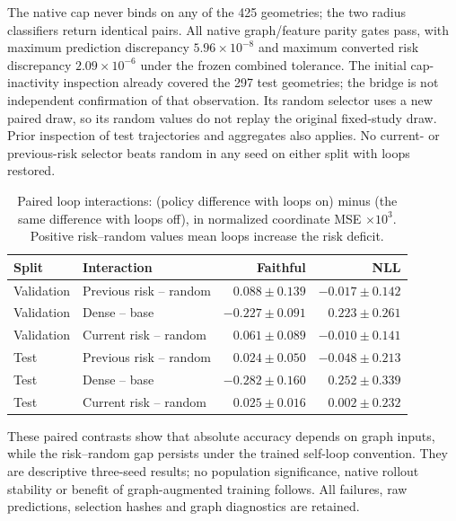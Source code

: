 The native cap never binds on any of the 425 geometries; the two radius
classifiers return identical pairs. All native graph/feature parity gates pass,
with maximum prediction discrepancy $5.96\times10^{-8}$ and maximum converted
risk discrepancy $2.09\times10^{-6}$ under the frozen combined tolerance.
The initial cap-inactivity inspection already covered the 297 test geometries;
the bridge is not independent confirmation of that observation. Its random
selector uses a new paired draw, so its random values do not replay the
original fixed-study draw. Prior inspection of test trajectories and aggregates
also applies. No current- or previous-risk selector beats random in any seed
on either split with loops restored.

\begin{table}[ht]
\centering\small
\caption{Paired loop interactions: (policy difference with loops on) minus
(the same difference with loops off), in normalized coordinate MSE $\times10^3$.
Positive risk--random values mean loops increase the risk deficit.}
\label{tab:graph-loop-interactions}
\begin{tabular}{llrr}
\toprule
Split & Interaction & Faithful & NLL\\
\midrule
Validation & Previous risk -- random & $0.088\pm0.139$ & $-0.017\pm0.142$\\
Validation & Dense -- base & $-0.227\pm0.091$ & $0.223\pm0.261$\\
Validation & Current risk -- random & $0.061\pm0.089$ & $-0.010\pm0.141$\\
Test & Previous risk -- random & $0.024\pm0.050$ & $-0.048\pm0.213$\\
Test & Dense -- base & $-0.282\pm0.160$ & $0.252\pm0.339$\\
Test & Current risk -- random & $0.025\pm0.016$ & $0.002\pm0.232$\\
\bottomrule
\end{tabular}
\end{table}

These paired contrasts show that absolute accuracy depends on graph inputs,
while the risk--random gap persists under the trained self-loop convention.
They are descriptive three-seed results; no population significance, native
rollout stability or benefit of graph-augmented training follows. All failures,
raw predictions, selection hashes and graph diagnostics are retained.
